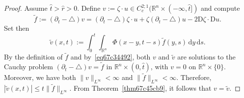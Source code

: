 \documentclass[a4paper,9pt]{amsart}
\newcommand{\R}{\mathbb{R}}	%
\newcommand{\did}{\,\mathrm{d}}	%
\newcommand{\de}{\partial}		%
\newcommand{\Diff}{\mathrm{D}}
\newcommand{\laplacian}{\triangle}
\theoremstyle{plain}
\theoremstyle{definition}
\theoremstyle{remark}
\begin{document}
{\begin{center}
\end{center}
\begin{proof}
	Assume $\hat t>\hat r>0$.
	Define $v:=\zeta\cdot u\in C^{2;1}_c(\R^n\times(-\infty,\hat t])$ and compute
	\begin{equation}
		\tilde f := (\de_t-\laplacian)v
		= (\de_t-\laplacian)\zeta\cdot u + \zeta (\de_t-\laplacian)u - 2 \Diff\zeta\cdot\Diff u .
	\end{equation}
	Set then 
	\begin{equation}
		\tilde v(x,t) := \int_0^t \int_{\R^n} \Phi(x-y,t-s) \tilde f(y,s) \did y\did s .
	\end{equation}
	By the definition of $\tilde f$ and by~\eqref{eq67c34492}, 
	both $v$ and $\tilde v$ are solutions to the Cauchy problem 
	$(\de_t-\laplacian)v=\tilde f$ in $\R^n\times(0,\hat t)$,
	with $v=0$ on $\R^n\times\{0\}$.
	Moreover, we have both $\|v\|_{L^\infty}<\infty$ and $\|\tilde f\|_{L^\infty}<\infty$.
	Therefore, $|\tilde v(x,t)|\le t \|\tilde f\|_{L^\infty}$.
	From Theorem~\ref{thm67c45cb9}, it follows that $v=\tilde v$.
	

\end{proof}}
\end{document}
